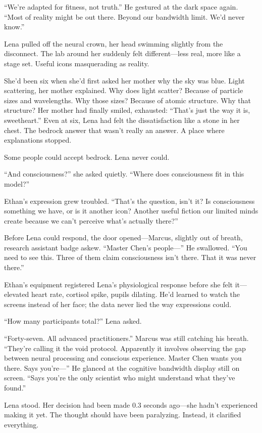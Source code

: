 ``We're adapted for fitness, not truth.'' He gestured at the dark space again. ``Most of reality might be out there. Beyond our bandwidth limit. We'd never know.''

Lena pulled off the neural crown, her head swimming slightly from the disconnect. The lab around her suddenly felt different—less real, more like a stage set. Useful icons masquerading as reality.

She'd been six when she'd first asked her mother why the sky was blue. Light scattering, her mother explained. Why does light scatter? Because of particle sizes and wavelengths. Why those sizes? Because of atomic structure. Why that structure? Her mother had finally smiled, exhausted: ``That's just the way it is, sweetheart.'' Even at six, Lena had felt the dissatisfaction like a stone in her chest. The bedrock answer that wasn't really an answer. A place where explanations stopped.

Some people could accept bedrock. Lena never could.

``And consciousness?'' she asked quietly. ``Where does consciousness fit in this model?''

Ethan's expression grew troubled. ``That's the question, isn't it? Is consciousness something we have, or is it another icon? Another useful fiction our limited minds create because we can't perceive what's actually there?''

Before Lena could respond, the door opened---Marcus, slightly out of breath, research assistant badge askew. ``Master Chen's people—'' He swallowed. ``You need to see this. Three of them claim consciousness isn't there. That it was never there.''

Ethan's equipment registered Lena's physiological response before she felt it—elevated heart rate, cortisol spike, pupils dilating. He'd learned to watch the screens instead of her face; the data never lied the way expressions could.

``How many participants total?'' Lena asked.

``Forty-seven. All advanced practitioners.'' Marcus was still catching his breath. ``They're calling it the void protocol. Apparently it involves observing the gap between neural processing and conscious experience. Master Chen wants you there. Says you're—'' He glanced at the cognitive bandwidth display still on screen. ``Says you're the only scientist who might understand what they've found.''

Lena stood. Her decision had been made 0.3 seconds ago—she hadn't experienced making it yet. The thought should have been paralyzing. Instead, it clarified everything.

